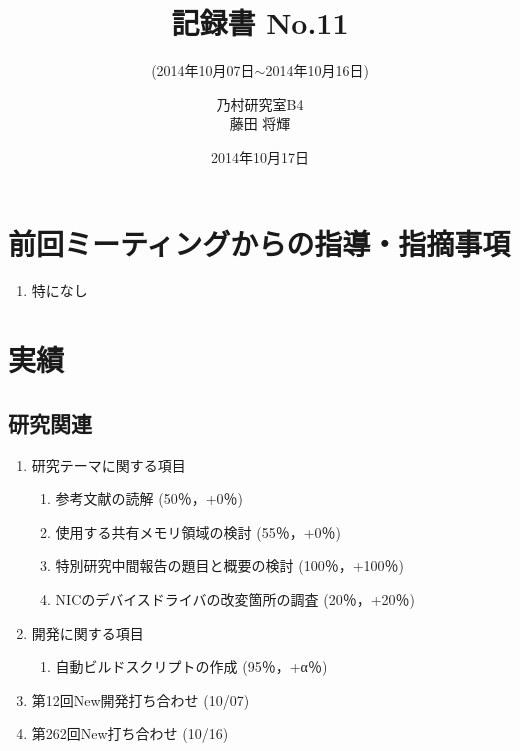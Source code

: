 \documentclass[fleqn, 14pt]{extarticle}
\subtitle{(2014年10月07日$\sim$2014年10月16日)}
\author{乃村研究室B4\\藤田 将輝}
\date{2014年10月17日}
\title{記録書 No.11}
\begin{document}
\maketitle




\section{前回ミーティングからの指導・指摘事項}
\label{sec-1}
\begin{enumerate}
\item 特になし
\newline
\hfill

\end{enumerate}




\section{実績}
\label{sec-2}

\subsection{研究関連}
\label{sec-2-1}
\begin{enumerate}
\item 研究テーマに関する項目
\hfill
\label{enum-research1}
\begin{enumerate}

\item 参考文献の読解
\hfill
\label{enum-1-A}
(50％，+0％)
\item 使用する共有メモリ領域の検討
\hfill
\label{enum-1-B}
(55％，+0％)
\item 特別研究中間報告の題目と概要の検討
\hfill
\label{enum-1-C}
(100％，+100％)
\item NICのデバイスドライバの改変箇所の調査
\hfill
\label{enum-1-D}
(20％，+20％)
\end{enumerate}
\item 開発に関する項目
\hfill
\label{enum-research2}
\begin{enumerate}

\item 自動ビルドスクリプトの作成
\hfill
\label{enum-2-A}
(95％，+α％)
\end{enumerate}

\item 第12回New開発打ち合わせ
\hfill
\label{enum-3}
(10/07)
\item 第262回New打ち合わせ
\hfill
\label{enum-4}
(10/16)



\end{enumerate}
\end{document}
